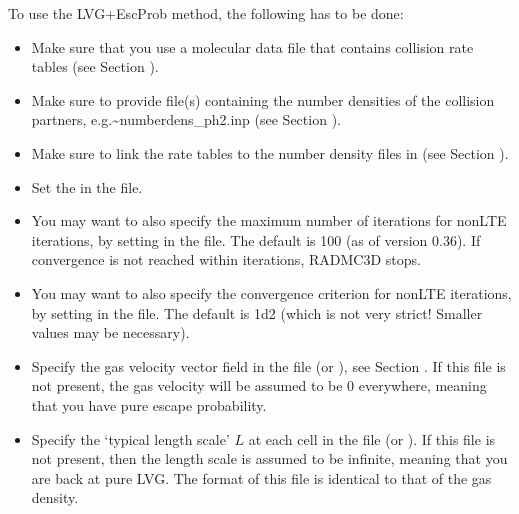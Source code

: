 \documentclass[letterpaper,10pt,english]{sphinxmanual}
\begin{document}
To use the LVG+EscProb method, the following has to be done:
\begin{itemize}
\item {} 
Make sure that you use a molecular data file that contains
collision rate tables (see Section {\hyperref[\detokenize{lineradtrans:sec-molecule-xxx-inp}]{}}).

\item {} 
Make sure to provide file(s) containing the number densities
of the collision partners, e.g.\textasciitilde{}\textasciigrave{}\textasciigrave{}numberdens\_p\sphinxhyphen{}h2.inp\textasciigrave{}\textasciigrave{}
(see Section {\hyperref[\detokenize{lineradtrans:sec-collpartner}]{}}).

\item {} 
Make sure to link the rate tables to the number density
files in  (see Section {\hyperref[\detokenize{lineradtrans:sec-line-dot-inp}]{}}).

\item {} 
Set the  in the  file.

\item {} 
You may want to also specify the maximum number of iterations for
non\sphinxhyphen{}LTE iterations, by setting  in the
 file. The default is 100 (as of version 0.36). If
convergence is not reached within 
iterations, RADMC\sphinxhyphen{}3D stops.

\item {} 
You may want to also specify the convergence criterion
for non\sphinxhyphen{}LTE iterations, by setting 
in the  file. The default is 1d\sphinxhyphen{}2 (which is
not very strict! Smaller values may be necessary).

\item {} 
Specify the gas velocity vector field in the file 
(or ), see Section
{\hyperref[\detokenize{lineradtrans:sec-velo-field}]{}}. If this file is not present, the gas velocity will
be assumed to be 0 everywhere, meaning that you have pure escape
probability.

\item {} 
Specify the ‘typical length scale’ \(L\) at each cell in the file
 (or ). If
this file is not present, then the length scale is assumed to be infinite,
meaning that you are back at pure LVG. The format of this file is
identical to that of the gas density.

\end{itemize}
\end{document}

